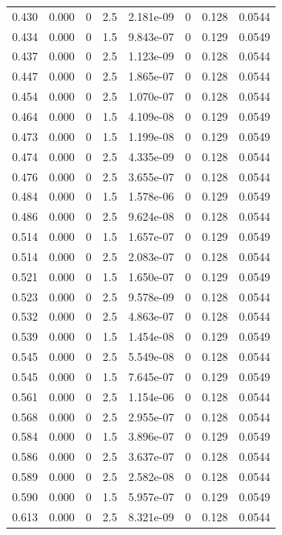 \documentclass[preview]{standalone}
\begin{document}
{{{\begin{tabular}{L{1.2cm}C{1.2cm} C{0.3cm}C{0.5cm} C{1.4cm}C{1.4cm} C{1.4cm}C{1.4cm}}
  0.430  &  0.000  & 0     & 2.5 &  2.181e-09  & 0  & 0.128 &  0.0544   \\ 
  0.434  &  0.000  & 0     & 1.5 &  9.843e-07  & 0  & 0.129 &  0.0549   \\ 
  0.437  &  0.000  & 0     & 2.5 &  1.123e-09  & 0  & 0.128 &  0.0544   \\ 
  0.447  &  0.000  & 0     & 2.5 &  1.865e-07  & 0  & 0.128 &  0.0544   \\ 
  0.454  &  0.000  & 0     & 2.5 &  1.070e-07  & 0  & 0.128 &  0.0544   \\ 
  0.464  &  0.000  & 0     & 1.5 &  4.109e-08  & 0  & 0.129 &  0.0549   \\ 
  0.473  &  0.000  & 0     & 1.5 &  1.199e-08  & 0  & 0.129 &  0.0549   \\ 
  0.474  &  0.000  & 0     & 2.5 &  4.335e-09  & 0  & 0.128 &  0.0544   \\ 
  0.476  &  0.000  & 0     & 2.5 &  3.655e-07  & 0  & 0.128 &  0.0544   \\ 
  0.484  &  0.000  & 0     & 1.5 &  1.578e-06  & 0  & 0.129 &  0.0549   \\ 
  0.486  &  0.000  & 0     & 2.5 &  9.624e-08  & 0  & 0.128 &  0.0544   \\ 
  0.514  &  0.000  & 0     & 1.5 &  1.657e-07  & 0  & 0.129 &  0.0549   \\ 
  0.514  &  0.000  & 0     & 2.5 &  2.083e-07  & 0  & 0.128 &  0.0544   \\ 
  0.521  &  0.000  & 0     & 1.5 &  1.650e-07  & 0  & 0.129 &  0.0549   \\ 
  0.523  &  0.000  & 0     & 2.5 &  9.578e-09  & 0  & 0.128 &  0.0544   \\ 
  0.532  &  0.000  & 0     & 2.5 &  4.863e-07  & 0  & 0.128 &  0.0544   \\ 
  0.539  &  0.000  & 0     & 1.5 &  1.454e-08  & 0  & 0.129 &  0.0549   \\ 
  0.545  &  0.000  & 0     & 2.5 &  5.549e-08  & 0  & 0.128 &  0.0544   \\ 
  0.545  &  0.000  & 0     & 1.5 &  7.645e-07  & 0  & 0.129 &  0.0549   \\ 
  0.561  &  0.000  & 0     & 2.5 &  1.154e-06  & 0  & 0.128 &  0.0544   \\ 
  0.568  &  0.000  & 0     & 2.5 &  2.955e-07  & 0  & 0.128 &  0.0544   \\ 
  0.584  &  0.000  & 0     & 1.5 &  3.896e-07  & 0  & 0.129 &  0.0549   \\ 
  0.586  &  0.000  & 0     & 2.5 &  3.637e-07  & 0  & 0.128 &  0.0544   \\ 
  0.589  &  0.000  & 0     & 2.5 &  2.582e-08  & 0  & 0.128 &  0.0544   \\ 
  0.590  &  0.000  & 0     & 1.5 &  5.957e-07  & 0  & 0.129 &  0.0549   \\ 
  0.613  &  0.000  & 0     & 2.5 &  8.321e-09  & 0  & 0.128 &  0.0544   \\ 
\hline 
\end{tabular} 

}}}
\end{document}
